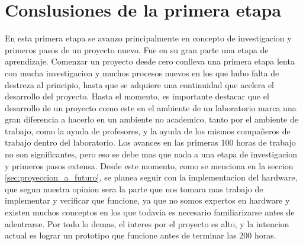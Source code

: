 \section{Conslusiones de la primera etapa} %
\label{sec:conslusiones_de_la_primera_etapa}

En esta primera etapa se avanzo principalmente en concepto de investigacion y primeros pasos de un proyecto nuevo. Fue en su gran parte una etapa de aprendizaje. Comenzar un proyecto desde cero conlleva una primera etapa lenta con mucha investigacion y muchos procesos nuevos en los que hubo falta de destreza al principio, hasta que se adquiere una continuidad que acelera el desarrollo del proyecto. Hasta el momento, es importante destacar que el desarrollo de un proyecto como este en el ambiente de un laboratorio marca una gran diferencia a hacerlo en un ambiente no academico, tanto por el ambiente de trabajo, como la ayuda de profesores, y la ayuda de los mismos compa\~neros de trabajo dentro del laboratorio. Los avances en las primeras 100 horas de trabajo no son significantes, pero eso se debe mas que nada a una etapa de investigacion y primeros pasos extensa. Desde este momento, como se menciona en la seccion \ref{sec:proyeccion_a_futuro}, se planea seguir con la implementacion del hardware, que segun nuestra opinion sera la parte que nos tomara mas trabajo de implementar y verificar que funcione, ya que no somos expertos en hardware y existen muchos conceptos en los que todavia es necesario familiarizarse antes de adentrarse. Por todo lo demas, el interes por el proyecto es alto, y la intencion actual es lograr un prototipo que funcione antes de terminar las 200 horas.

\clearpage